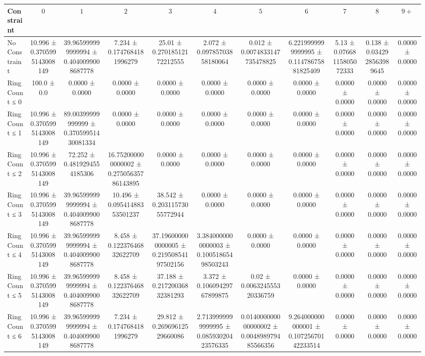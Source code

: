 \begin{table}[H]
    \centering
    \begin{tabular}{l c c c c c c c c c c}
        \toprule
        \textbf{Constraint} & $0$ & $1$ & $2$ & $3$ & $4$ & $5$ & $6$ & $7$ & $8$ & $9+$ \\
        \midrule
        No Constraint & 10.996 ± 0.3705995143008149 & 39.965999999999994 ± 0.4040099008687778 & 7.234 ± 0.1747684181996279 & 25.01 ± 0.27018512172212555 & 2.072 ± 0.09785703858180064 & 0.012 ± 0.0074833147735478825 & 6.2219999999999995 ± 0.11478675881825409 & 5.13 ± 0.07668115805072333 & 0.138 ± 0.0342928563989645 & 0.0000 ± 0.0000 \\
        Ring Count ≤ 0 & 100.0 ± 0.0 & 0.0000 ± 0.0000 & 0.0000 ± 0.0000 & 0.0000 ± 0.0000 & 0.0000 ± 0.0000 & 0.0000 ± 0.0000 & 0.0000 ± 0.0000 & 0.0000 ± 0.0000 & 0.0000 ± 0.0000 & 0.0000 ± 0.0000 \\
        Ring Count ≤ 1 & 10.996 ± 0.3705995143008149 & 89.00399999999999 ± 0.37059951430081334 & 0.0000 ± 0.0000 & 0.0000 ± 0.0000 & 0.0000 ± 0.0000 & 0.0000 ± 0.0000 & 0.0000 ± 0.0000 & 0.0000 ± 0.0000 & 0.0000 ± 0.0000 & 0.0000 ± 0.0000 \\
        Ring Count ≤ 2 & 10.996 ± 0.3705995143008149 & 72.252 ± 0.4819294554185306 & 16.752000000000002 ± 0.27505635786143895 & 0.0000 ± 0.0000 & 0.0000 ± 0.0000 & 0.0000 ± 0.0000 & 0.0000 ± 0.0000 & 0.0000 ± 0.0000 & 0.0000 ± 0.0000 & 0.0000 ± 0.0000 \\
        Ring Count ≤ 3 & 10.996 ± 0.3705995143008149 & 39.965999999999994 ± 0.4040099008687778 & 10.496 ± 0.09541488353501237 & 38.542 ± 0.20311573055772944 & 0.0000 ± 0.0000 & 0.0000 ± 0.0000 & 0.0000 ± 0.0000 & 0.0000 ± 0.0000 & 0.0000 ± 0.0000 & 0.0000 ± 0.0000 \\
        Ring Count ≤ 4 & 10.996 ± 0.3705995143008149 & 39.965999999999994 ± 0.4040099008687778 & 8.458 ± 0.12237646832622709 & 37.196000000000005 ± 0.21950854197502156 & 3.3840000000000003 ± 0.10051865498503243 & 0.0000 ± 0.0000 & 0.0000 ± 0.0000 & 0.0000 ± 0.0000 & 0.0000 ± 0.0000 & 0.0000 ± 0.0000 \\
        Ring Count ≤ 5 & 10.996 ± 0.3705995143008149 & 39.965999999999994 ± 0.4040099008687778 & 8.458 ± 0.12237646832622709 & 37.188 ± 0.21720036832381293 & 3.372 ± 0.10609429767899875 & 0.02 ± 0.006324555320336759 & 0.0000 ± 0.0000 & 0.0000 ± 0.0000 & 0.0000 ± 0.0000 & 0.0000 ± 0.0000 \\
        Ring Count ≤ 6 & 10.996 ± 0.3705995143008149 & 39.965999999999994 ± 0.4040099008687778 & 7.234 ± 0.1747684181996279 & 29.812 ± 0.26969612529660086 & 2.7139999999999995 ± 0.08593020423576335 & 0.014000000000000002 ± 0.004898979485566356 & 9.264000000000001 ± 0.10725670142233514 & 0.0000 ± 0.0000 & 0.0000 ± 0.0000 & 0.0000 ± 0.0000 \\

\end{tabular}
\end{table}
